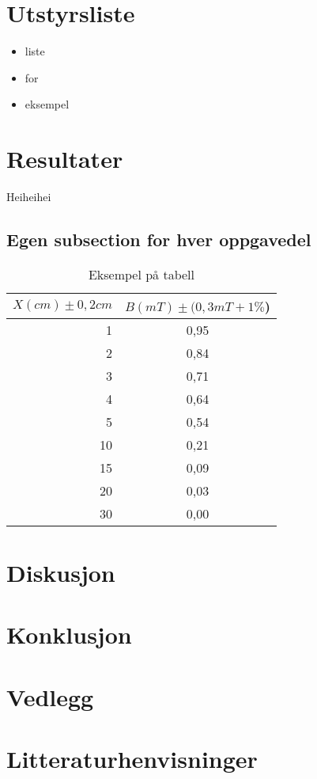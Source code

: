 \documentclass[12pt,norsk,a4paper]{article}
\begin{document}
\section{Utstyrsliste} 
    \begin{itemize} %
    \item liste     %
    \item for
    \item eksempel
    \end{itemize}
\clearpage


\section{Resultater}
Heiheihei
\subsection{Egen subsection for hver oppgavedel}


\begin{table}[H] %
\begin{center}
	\begin{tabular}{ | r | c |} %
	\hline
	$X(cm )\pm0,2cm$  &$B(mT)\pm(0,3mT+1\%$) \\ \hline %
    1 & 0,95\\ \hline   %
    2 & 0,84\\ \hline
    3 & 0,71\\ \hline
    4 & 0,64\\ \hline
    5 & 0,54\\ \hline
    10 & 0,21\\ \hline
    15 & 0,09\\ \hline
    20 & 0,03\\ \hline
    30 & 0,00\\ \hline
    \hline
    \end{tabular}
    \end{center}
    \caption{Eksempel på tabell}

\end{table}
\clearpage

\section{Diskusjon}
\clearpage

\section{Konklusjon}
\clearpage

\section{Vedlegg}
\clearpage
\section{Litteraturhenvisninger}
\end{document}
